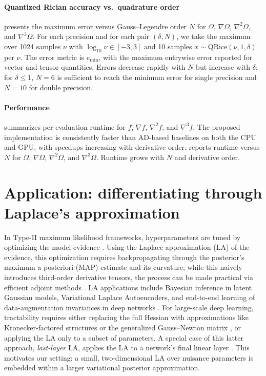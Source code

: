 \documentclass{article}
\begin{document}
\paragraph{Quantized Rician accuracy vs.\ quadrature order}

 presents the maximum error versus Gauss--Legendre order $N$ for $\Omega$, $\nabla\Omega$, $\nabla^2\Omega$, and $\nabla^3\Omega$.
For each precision and for each pair $(\delta, N)$, we take the maximum over 1024 samples $\nu$ with $\log_{10} \nu \in [-3, 3]$ and 10 samples $x \sim \mathrm{QRice}(\nu, 1, \delta)$ per $\nu$.
The error metric is $e_{\min}$, with the maximum entrywise error reported for vector and tensor quantities.
Errors decrease rapidly with $N$ but increase with $\delta$; for $\delta \le 1$, $N=6$ is sufficient to reach the minimum error for single precision and $N=10$ for double precision.

\paragraph{Performance}

 summarizes per-evaluation runtime for $f$, $\nabla f$, $\nabla^2 f$, and $\nabla^3 f$.
The proposed implementation is consistently faster than AD-based baselines on both the CPU and GPU, with speedups increasing with derivative order.
 reports runtime versus $N$ for $\Omega$, $\nabla\Omega$, $\nabla^2\Omega$, and $\nabla^3\Omega$.
Runtime grows with $N$ and derivative order.

\section{Application: differentiating through Laplace's approximation}

In Type-II maximum likelihood frameworks, hyperparameters are tuned by optimizing the model evidence \citep{mackay_bayesian_1992}.
Using the Laplace approximation (LA) of the evidence, this optimization requires backpropagating through the posterior's maximum a posteriori (MAP) estimate and its curvature;
while this naively introduces third-order derivative tensors, the process can be made practical via efficient adjoint methods \citep{margossian_hamiltonian_2020}.
LA applications include Bayesian inference in latent Gaussian models, Variational Laplace Autoencoders, and end-to-end learning of data-augmentation invariances in deep networks \citep{margossian_hamiltonian_2020, park_variational_2019, immer_invariance_2022}.
For large-scale deep learning, tractability requires either replacing the full Hessian with approximations like Kronecker-factored structures or the generalized Gauss--Newton matrix \citep{ritter_scalable_2018, immer_improving_2021}, or applying the LA only to a subset of parameters.
A special case of this latter approach, \textit{last-layer} LA, applies the LA to a network's final linear layer \citep{kristiadi_being_2020, daxberger_laplace_2021}.
This motivates our setting:
a small, two-dimensional LA over nuisance parameters is embedded within a larger variational posterior approximation.
\end{document}
